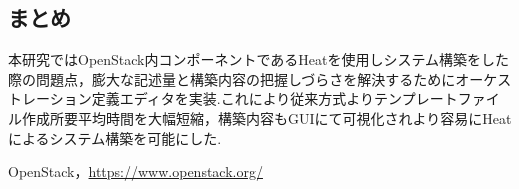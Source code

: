 \documentclass[a4j]{jarticle}
\begin{document}
\begin{Abstract}
 \section{まとめ}
 本研究ではOpenStack内コンポーネントであるHeatを使用しシステム構築をした際の問題点，膨大な記述量と構築内容の把握しづらさを解決するためにオーケストレーション定義エディタを実装.これにより従来方式よりテンプレートファイル作成所要平均時間を大幅短縮，構築内容もGUIにて可視化されより容易にHeatによるシステム構築を可能にした.
 
\begin{thebibliography}{99}
  OpenStack，\url{https://www.openstack.org/}
\end{thebibliography}

\end{Abstract}
\end{document}
